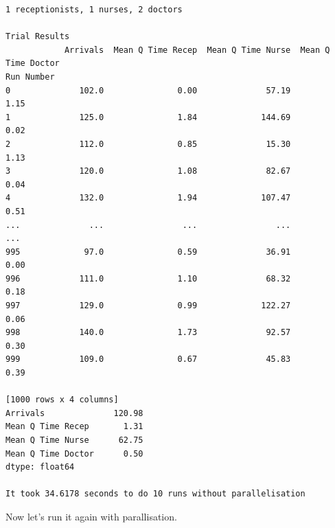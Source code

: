 \documentclass[
  letterpaper,
  DIV=11,
  numbers=noendperiod]{scrreprt}
\begin{document}
\begin{verbatim}
1 receptionists, 1 nurses, 2 doctors

Trial Results
            Arrivals  Mean Q Time Recep  Mean Q Time Nurse  Mean Q Time Doctor
Run Number                                                                    
0              102.0               0.00              57.19                1.15
1              125.0               1.84             144.69                0.02
2              112.0               0.85              15.30                1.13
3              120.0               1.08              82.67                0.04
4              132.0               1.94             107.47                0.51
...              ...                ...                ...                 ...
995             97.0               0.59              36.91                0.00
996            111.0               1.10              68.32                0.18
997            129.0               0.99             122.27                0.06
998            140.0               1.73              92.57                0.30
999            109.0               0.67              45.83                0.39

[1000 rows x 4 columns]
Arrivals              120.98
Mean Q Time Recep       1.31
Mean Q Time Nurse      62.75
Mean Q Time Doctor      0.50
dtype: float64

It took 34.6178 seconds to do 10 runs without parallelisation
\end{verbatim}

Now let's run it again with parallisation.

\begin{tcolorbox}[enhanced jigsaw, rightrule=.15mm, colback=white, colframe=quarto-callout-note-color-frame, colbacktitle=quarto-callout-note-color!10!white, toprule=.15mm, coltitle=black, opacityback=0, titlerule=0mm, bottomtitle=1mm, breakable, title=\textcolor{quarto-callout-note-color}{\faInfo}\hspace{0.5em}{Click here to view the full code}, opacitybacktitle=0.6, toptitle=1mm, arc=.35mm, bottomrule=.15mm, leftrule=.75mm, left=2mm]

\end{tcolorbox}
\end{document}

